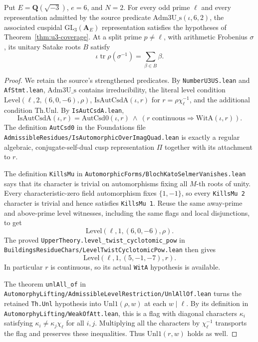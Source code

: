 \begin{lemma}[K17-S17-U3-LEVEL]\label{lem:step17-u3-level}
Put $E=\mathbf Q(\sqrt{-3})$, $e=6$, and $N=2$.
For every odd prime $\ell$ and every representation admitted by the
source predicate $\mathrm{Adm3U\_s}(\iota,6,2)$, the associated cuspidal
$\mathrm{GL}_3(\mathbf A_E)$ representation satisfies the hypotheses of
Theorem~\ref{thm:u3-coverage}. At a split prime $p\ne\ell$, with arithmetic
Frobenius $\sigma$, its unitary Satake roots $B$ satisfy
\[
 \iota\operatorname{tr}\rho(\sigma^{-1})=\sum_{\beta\in B}\beta.
\]
\end{lemma}

\begin{proof}
We retain the source's strengthened predicates. By
\texttt{NumberU3US.lean} and \texttt{AfStmt.lean},
$\mathrm{Adm3U\_s}$ contains irreducibility, the literal level condition
$\mathrm{Level}(\ell,2,(6,0,-6),\rho)$,
$\mathrm{IsAutCsdA}(\iota,r)$ for $r=\rho\chi_\ell^{-1}$,
and the additional condition $\mathrm{Th.Unl}$.
By \texttt{IsAutCsdA.lean},
\[
 \mathrm{IsAutCsdA}(\iota,r)=
 \mathrm{AutCsd0}(\iota,r)\ \wedge\
 (r\text{ continuous}\Rightarrow\mathrm{WitA}(\iota,r)).
\]
The definition \texttt{AutCsd0} in the Foundations file
\texttt{AdmissibleResidues/IsAutomorphicOverImagQuad.lean}
is exactly a regular algebraic, conjugate-self-dual cusp representation
$\Pi$ together with its attachment to $r$.

The definition \texttt{KillsMu} in
\texttt{AutomorphicForms/BlochKatoSelmerVanishes.lean}
says that its character is trivial on automorphisms fixing all $M$-th
roots of unity. Every characteristic-zero field automorphism fixes
$\{1,-1\}$, so every \texttt{KillsMu 2} character is trivial and hence
satisfies \texttt{KillsMu 1}. Reuse the same away-prime and above-prime
level witnesses, including the same flags and local disjunctions, to get
\[
 \mathrm{Level}(\ell,1,(6,0,-6),\rho).
\]
The proved \texttt{UpperTheory.level\_twist\_cyclotomic\_pow}
in \texttt{BuildingsResidueChars/LevelTwistCyclotomicPow.lean}
then gives
\[
 \mathrm{Level}(\ell,1,(5,-1,-7),r).
\]
In particular $r$ is continuous, so its actual \texttt{WitA} hypothesis
is available.

The theorem \texttt{unlAll\_of} in
\texttt{AutomorphyLifting/AdmissibleLevelRestriction/UnlAllOf.lean}
turns the retained \texttt{Th.Unl} hypothesis into
$\mathrm{Unl1}(\rho,w)$ at each $w\mid\ell$.
By its definition in \texttt{AutomorphyLifting/WeakOfAtt.lean}, this is a
flag with diagonal characters $\kappa_i$ satisfying
$\kappa_i\ne\kappa_j\chi_\ell$ for all $i,j$.
Multiplying all the characters by $\chi_\ell^{-1}$ transports the flag
and preserves these inequalities. Thus $\mathrm{Unl1}(r,w)$ holds as well.


\end{proof}
